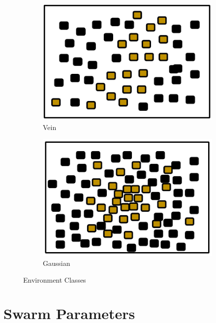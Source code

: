 \begin{figure} [h]
\begin{subfigure}[b]{0.2\textwidth}
                \includegraphics[width=\textwidth]{chapters/chapter4/figures/veinenv.pdf}
                \caption{Vein}
                \label{fig:veinenv}
        \end{subfigure}  
        \begin{subfigure}[b]{0.2\textwidth}
                        \includegraphics[width=\textwidth]{chapters/chapter4/figures/gaussianenv}
                        \caption{Gaussian}
                        \label{fig:gaussianenv}
       \end{subfigure}
        \caption{Environment Classes}\label{fig:environments}
\end{figure}


\section{Swarm Parameters}
\label{parameters}


